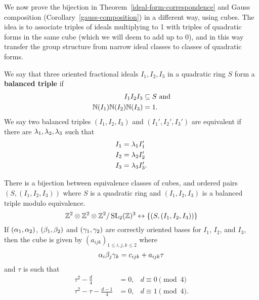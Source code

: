 %
We now prove the bijection in Theorem~\ref{ideal-form-correspondence} and Gauss composition (Corollary~\ref{gauss-composition}) in a different way, using cubes. The idea is to associate triples of ideals multiplying to 1 with triples of quadratic forms in the same cube (which we will deem to add up to 0), and in this way transfer the group structure from narrow ideal classes to classes of quadratic forms.
\begin{df}
We say that three oriented fractional ideals $I_1,I_2,I_3$ in a quadratic ring $S$ form a \textbf{balanced triple} if
\begin{align*}
I_1I_2I_3&\subseteq S\text{ and}\\
\mathbb{N}(I_1)\mathbb{N}(I_2)\mathbb{N}(I_3)&=1.
\end{align*}
We say two balanced triples $(I_1,I_2,I_3)$ and $(I_1',I_2',I_3')$ are equivalent if there are $\lambda_1,\lambda_2,\lambda_3$ such that
\begin{align*}
I_1&=\lambda_1 I_1'\\
I_2&=\lambda_2 I_2'\\
I_3&=\lambda_3 I_3'.
\end{align*}
\end{df}
\begin{thm}
There is a bijection between equivalence classes of cubes, and ordered pairs $(S,(I_1,I_2,I_3))$ where $S$ is a quadratic ring and $(I_1,I_2,I_3)$ is a balanced triple modulo equivalence.
\[
\mathbb{Z}^2\otimes\mathbb{Z}^2\otimes\mathbb{Z}^2/\operatorname{SL}_2(\mathbb{Z})^3\leftrightarrow \{(S,(I_1,I_2,I_3))\}
\]
If $(\alpha_1,\alpha_2)$, $(\beta_1,\beta_2)$ and $(\gamma_1,\gamma_2)$ are correctly oriented bases for $I_1$, $I_2$, and $I_3$, then the cube is given by $(a_{ijk})_{1\le i,j,k\le 2}$ where
\[
\alpha_i\beta_j\gamma_k = c_{ijk}+a_{ijk} \tau
\]
and $\tau$ is such that 
\begin{align*}
\tau^2-\frac d4&=0,&d\equiv 0\pmod 4\\
\tau^2-\tau-\frac{d-1}{4}&=0,&d\equiv 1\pmod 4.
\end{align*}
\end{thm}
